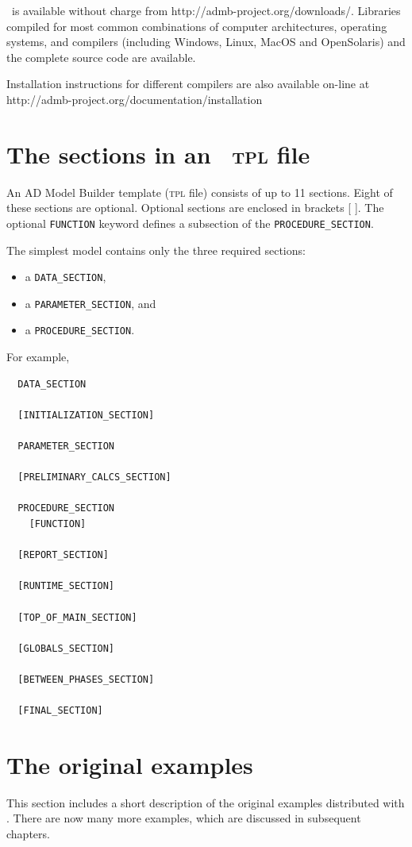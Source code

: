 \documentclass{admbmanual}
\newcommand\DS{\texttt{DATA\_SECTION}}
\newcommand\PS{\texttt{PARAMETER\_SECTION}}
\newcommand\PROS{\texttt{PROCEDURE\_SECTION}}
\begin{document}
\ADM\ is available without charge from http://admb-project.org/downloads/.
Libraries compiled for most common combinations of computer architectures,
operating systems, and compilers (including Windows, Linux, MacOS and
OpenSolaris) and the complete source code are available.

Installation instructions for different compilers are also available on-line
at\\
http://admb-project.org/documentation/installation

\section{The sections in an \ADMS\ \textsc{tpl} file}

An AD Model Builder template (\textsc{tpl} file) consists of up to 11 sections.
Eight of these sections are optional. Optional sections are
enclosed in brackets [ ]. The optional \texttt{FUNCTION} keyword defines a
subsection of the \PROS.

The simplest model contains only the three required sections:
\begin{itemize}
  \item a \DS,
  \item a \PS, and
  \item a \PROS.
\end{itemize}

For example,
\begin{lstlisting}
  DATA_SECTION

  [INITIALIZATION_SECTION]

  PARAMETER_SECTION

  [PRELIMINARY_CALCS_SECTION]

  PROCEDURE_SECTION
    [FUNCTION]

  [REPORT_SECTION]

  [RUNTIME_SECTION]

  [TOP_OF_MAIN_SECTION]

  [GLOBALS_SECTION]

  [BETWEEN_PHASES_SECTION]

  [FINAL_SECTION]
\end{lstlisting}

\section{The original \ADMS examples}

This section includes a short description of the original examples distributed
with \ADM. There are now many more examples, which are discussed in subsequent
chapters.
\end{document}
